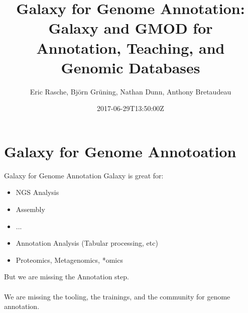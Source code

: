 \documentclass[12pt]{phage3slides} %
\title[Galaxy for Genome Annotation, Teaching, Databases]{Galaxy for Genome Annotation: Galaxy and GMOD for Annotation, Teaching, and Genomic Databases}
\author[ER, BG, ND, AB]{Eric Rasche, Bj\"orn Gr\"uning, Nathan Dunn, Anthony Bretaudeau}
\date{2017-06-29T13:50:00Z}
\begin{document}
\frame{\titlepage}




\section[GGA]{Galaxy for Genome Annotoation}
\begin{frame}{Galaxy for Genome Annotation}
    Galaxy is great for:
    \begin{itemize}
        \item NGS Analysis
        \item Assembly
        \item ...
        \item Annotation Analysis (Tabular processing, etc)
        \item Proteomics, Metagenomics, *omics
    \end{itemize}
    But we are missing the Annotation step.\\\ \\
    We are missing the tooling, the
    trainings, and the community for genome annotation.
\end{frame}
\end{document}
